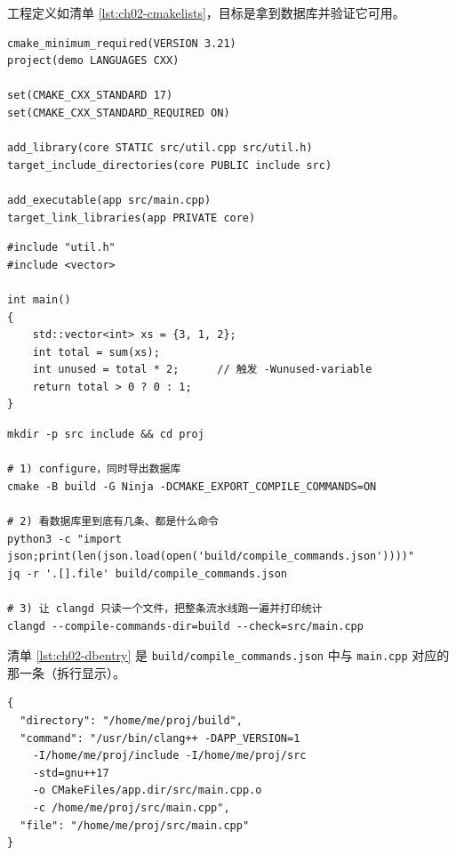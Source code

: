 \documentclass[12pt,a4paper,fontset=fandol]{ctexbook}
\begin{document}
工程定义如清单 \ref{lst:ch02-cmakelists}，目标是拿到数据库并验证它可用。

\begin{lstlisting}[style=cmakestyle,caption={CMakeLists.txt：三个源文件的最小工程},label={lst:ch02-cmakelists}]
cmake_minimum_required(VERSION 3.21)
project(demo LANGUAGES CXX)

set(CMAKE_CXX_STANDARD 17)
set(CMAKE_CXX_STANDARD_REQUIRED ON)

add_library(core STATIC src/util.cpp src/util.h)
target_include_directories(core PUBLIC include src)

add_executable(app src/main.cpp)
target_link_libraries(app PRIVATE core)
\end{lstlisting}

\begin{lstlisting}[style=cppstyle,caption={src/main.cpp：故意留一处会被诊断的问题},label={lst:ch02-main}]
#include "util.h"
#include <vector>

int main()
{
    std::vector<int> xs = {3, 1, 2};
    int total = sum(xs);
    int unused = total * 2;      // 触发 -Wunused-variable
    return total > 0 ? 0 : 1;
}
\end{lstlisting}

\begin{lstlisting}[style=shellstyle,caption={完整操作序列：生成、查看、验证数据库},label={lst:ch02-chain}]
mkdir -p src include && cd proj

# 1) configure，同时导出数据库
cmake -B build -G Ninja -DCMAKE_EXPORT_COMPILE_COMMANDS=ON

# 2) 看数据库里到底有几条、都是什么命令
python3 -c "import json;print(len(json.load(open('build/compile_commands.json'))))"
jq -r '.[].file' build/compile_commands.json

# 3) 让 clangd 只读一个文件，把整条流水线跑一遍并打印统计
clangd --compile-commands-dir=build --check=src/main.cpp
\end{lstlisting}

清单 \ref{lst:ch02-dbentry} 是 \texttt{build/compile\_commands.json}
中与 \texttt{main.cpp} 对应的那一条（拆行显示）。

\begin{lstlisting}[style=jsonstyle,caption={数据库里 main.cpp 对应的条目
（为排版拆行，实际是一行；JSON 字符串内部不允许换行）},label={lst:ch02-dbentry}]
{
  "directory": "/home/me/proj/build",
  "command": "/usr/bin/clang++ -DAPP_VERSION=1
    -I/home/me/proj/include -I/home/me/proj/src
    -std=gnu++17
    -o CMakeFiles/app.dir/src/main.cpp.o
    -c /home/me/proj/src/main.cpp",
  "file": "/home/me/proj/src/main.cpp"
}
\end{lstlisting}
\end{document}
